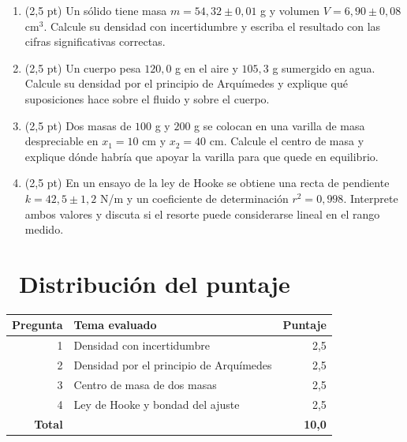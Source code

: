\documentclass[11pt,a4paper]{article}
\newcommand{\iconotexto}[2]{\textcolor{cyanNeon}{\faIcon{#1}}~#2}
\begin{document}
\begin{enumerate}[leftmargin=1.4em,itemsep=2pt,topsep=3pt]
  \item (2,5 pt) Un sólido tiene masa $m = 54{,}32 \pm 0{,}01$ g y volumen $V = 6{,}90 \pm 0{,}08$ cm$^3$. Calcule su densidad con incertidumbre y escriba el resultado con las cifras significativas correctas.
  \item (2,5 pt) Un cuerpo pesa $120{,}0$ g en el aire y $105{,}3$ g sumergido en agua. Calcule su densidad por el principio de Arquímedes y explique qué suposiciones hace sobre el fluido y sobre el cuerpo.
  \item (2,5 pt) Dos masas de $100$ g y $200$ g se colocan en una varilla de masa despreciable en $x_1 = 10$ cm y $x_2 = 40$ cm. Calcule el centro de masa y explique dónde habría que apoyar la varilla para que quede en equilibrio.
  \item (2,5 pt) En un ensayo de la ley de Hooke se obtiene una recta de pendiente $k = 42{,}5 \pm 1{,}2$ N/m y un coeficiente de determinación $r^2 = 0{,}998$. Interprete ambos valores y discuta si el resorte puede considerarse lineal en el rango medido.
\end{enumerate}

\section{\iconotexto{ruler-combined}{Distribución del puntaje}}

\begin{tabularx}{\linewidth}{@{}r X r@{}}
\toprule
Pregunta & Tema evaluado & Puntaje\\
\midrule
1 & Densidad con incertidumbre & 2,5 \\
2 & Densidad por el principio de Arquímedes & 2,5 \\
3 & Centro de masa de dos masas & 2,5 \\
4 & Ley de Hooke y bondad del ajuste & 2,5 \\
\midrule
\textbf{Total} & & \textbf{10,0}\\
\bottomrule
\end{tabularx}
\end{document}
